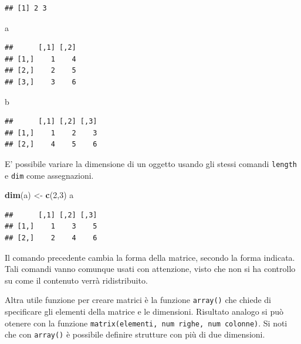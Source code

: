 \documentclass[]{book}
\newenvironment{Shaded}{\begin{snugshade}}{\end{snugshade}}
\newcommand{\DecValTok}[1]{\textcolor[rgb]{0.00,0.00,0.81}{#1}}
\newcommand{\KeywordTok}[1]{\textcolor[rgb]{0.13,0.29,0.53}{\textbf{#1}}}
\newcommand{\NormalTok}[1]{#1}
\newcommand{\StringTok}[1]{\textcolor[rgb]{0.31,0.60,0.02}{#1}}
\begin{document}
\begin{verbatim}
## [1] 2 3
\end{verbatim}

\begin{Shaded}
\begin{Highlighting}[]
\NormalTok{a}
\end{Highlighting}
\end{Shaded}

\begin{verbatim}
##      [,1] [,2]
## [1,]    1    4
## [2,]    2    5
## [3,]    3    6
\end{verbatim}

\begin{Shaded}
\begin{Highlighting}[]
\NormalTok{b}
\end{Highlighting}
\end{Shaded}

\begin{verbatim}
##      [,1] [,2] [,3]
## [1,]    1    2    3
## [2,]    4    5    6
\end{verbatim}

E' possibile variare la dimensione di un oggetto usando gli stessi comandi \texttt{length} e \texttt{dim} come assegnazioni.

\begin{Shaded}
\begin{Highlighting}[]
\KeywordTok{dim}\NormalTok{(a) <-}\StringTok{ }\KeywordTok{c}\NormalTok{(}\DecValTok{2}\NormalTok{,}\DecValTok{3}\NormalTok{)}
\NormalTok{a}
\end{Highlighting}
\end{Shaded}

\begin{verbatim}
##      [,1] [,2] [,3]
## [1,]    1    3    5
## [2,]    2    4    6
\end{verbatim}

Il comando precedente cambia la forma della matrice, secondo la forma indicata. Tali comandi vanno comunque usati con attenzione, visto che non si ha controllo su come il contenuto verrà ridistribuito.

Altra utile funzione per creare matrici è la funzione \texttt{array()} che chiede di specificare gli elementi della matrice e le dimensioni. Risultato analogo si può otenere con la funzione \texttt{matrix(elementi,\ num\ righe,\ num\ colonne)}. Si noti che con \texttt{array()} è possibile definire strutture con più di due dimensioni.
\end{document}
